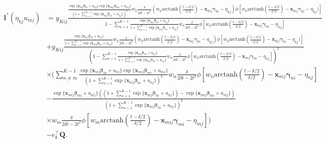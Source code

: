\documentclass[12pt, %
               openright, %
               oneside, %
               a4paper, %
               chapter=TITLE, %
               section=TITLE, %
               brazil,
               english %
]{abntex2}
\begin{document}
\begin{apendicesenv}
\begin{align*}
\end{align*}
\begin{align*}
 \bm{l}^{''}(\eta_{kj} u_{mj}) &=
 y_{Kij}
 \frac{\frac{\exp\{\bm{x}_{kij} \bm{\beta}_{ki} + u_{kj}\}
             \exp\{\bm{x}_{mij} \bm{\beta}_{mi} + u_{mj}\}}{
       \left( 1 + \sum_{n = 1}^{K-1}
                  \exp\{\bm{x}_{nij} \bm{\beta}_{ni} + u_{nj}\}
       \right)^{2}}
 w_{k}\frac{\delta}{2\delta t - 2t^{2}}
(w_{k} \text{arctanh}\left(\frac{t-\delta/2}{\delta/2}\right)
  - \bm{x}_{kij}\bm{\gamma}_{ki} - \eta_{kj})
 \phi[w_{k} \text{arctanh}\left(\frac{t-\delta/2}{\delta/2}\right)
      - \bm{x}_{kij}\bm{\gamma}_{ki} - \eta_{kj})]}{
 1 - \sum_{n = 1}^{K-1}
     \frac{\exp\{\bm{x}_{nij} \bm{\beta}_{ni} + u_{nj}\}}{
           1 + \sum_{n = 1}^{K-1}
               \exp\{\bm{x}_{nij} \bm{\beta}_{ni} + u_{nj}\}}
           w_{n}\frac{\delta}{2\delta t - 2t^{2}}
      \phi[w_{n} \text{arctanh}\left(\frac{t-\delta/2}{\delta/2}\right)
           - \bm{x}_{nij}\bm{\gamma}_{ni} - \eta_{nj}]}\\
 &+
 y_{Kij}
 \frac{\frac{\exp\{\bm{x}_{kij} \bm{\beta}_{ki} + u_{kj}\}}{
       1 + \sum_{n = 1}^{K-1}
           \exp\{\bm{x}_{nij} \bm{\beta}_{ni} + u_{nj}\}}
 w_{k}\frac{\delta}{2\delta t - 2t^{2}}
(w_{k} \text{arctanh}\left(\frac{t-\delta/2}{\delta/2}\right)
  - \bm{x}_{kij}\bm{\gamma}_{ki} - \eta_{kj})
 \phi[w_{k} \text{arctanh}\left(\frac{t-\delta/2}{\delta/2}\right)
      - \bm{x}_{kij}\bm{\gamma}_{ki} - \eta_{kj})]}{
 \left(1 - \sum_{n = 1}^{K-1}
           \frac{\exp\{\bm{x}_{nij} \bm{\beta}_{ni} + u_{nj}\}}{
       1 + \sum_{n = 1}^{K-1}
           \exp\{\bm{x}_{nij} \bm{\beta}_{ni} + u_{nj}\}}
 w_{n}\frac{\delta}{2\delta t - 2t^{2}}
 \phi[w_{n} \text{arctanh}\left(\frac{t-\delta/2}{\delta/2}\right)
      - \bm{x}_{nij}\bm{\gamma}_{ni} - \eta_{nj}]\right)^{2}}\\
 &\times
 \Bigg( \sum_{n \neq m}^{K-1}
        \frac{\exp\{\bm{x}_{nij} \bm{\beta}_{ni} + u_{nj}\}
              \exp\{\bm{x}_{mij} \bm{\beta}_{mi} + u_{mj}\}}{
        \left( 1 + \sum_{n = 1}^{K-1}
                   \exp\{\bm{x}_{nij} \bm{\beta}_{ni} + u_{nj}\}
        \right)^{2}}
        w_{n}\frac{\delta}{2\delta t - 2t^{2}}
        \phi[w_{n}
             \text{arctanh}\left(\frac{t-\delta/2}{\delta/2}\right)
             - \bm{x}_{nij}\bm{\gamma}_{ni} - \eta_{nj}]\\
  &- \frac{\exp\{\bm{x}_{mij} \bm{\beta}_{mi} + u_{mj}\}
          \left(
          \left(1 + \sum_{n = 1}^{K-1}
                    \exp\{\bm{x}_{nij} \bm{\beta}_{ni} + u_{nj}\}
          \right) - \exp\{\bm{x}_{mij} \bm{\beta}_{mi} + u_{mj}\}
          \right)}{\left(1 + \sum_{n = 1}^{K-1}
                             \exp\{\bm{x}_{nij} \bm{\beta}_{ni} + u_{nj}
                                 \}
                   \right)^{2}}\\
  &\times
  w_{m}\frac{\delta}{2\delta t - 2t^{2}}
  \phi[w_{m} \text{arctanh}\left(\frac{t-\delta/2}{\delta/2}\right)
       - \bm{x}_{mij}\bm{\gamma}_{mi} - \eta_{mj}]\Bigg)\\
 &- e_{k}^{\top} \bm{Q}.
\end{align*}

\end{apendicesenv}
\end{document}
